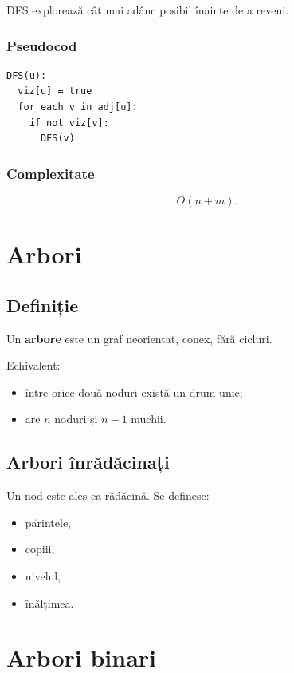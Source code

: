 \documentclass[12pt]{article}
\begin{document}
DFS explorează cât mai adânc posibil înainte de a reveni.

\subsubsection*{Pseudocod}

\begin{verbatim}
DFS(u):
  viz[u] = true
  for each v in adj[u]:
    if not viz[v]:
      DFS(v)
\end{verbatim}

\subsubsection*{Complexitate}



\[
O(n + m).
\]



\section{Arbori}

\subsection{Definiție}

Un \textbf{arbore} este un graf neorientat, conex, fără cicluri.

Echivalent:
\begin{itemize}
    \item între orice două noduri există un drum unic;
    \item are $n$ noduri și $n-1$ muchii.
\end{itemize}

\subsection{Arbori înrădăcinați}

Un nod este ales ca rădăcină. Se definesc:
\begin{itemize}
    \item părintele,
    \item copiii,
    \item nivelul,
    \item înălțimea.
\end{itemize}

\section{Arbori binari}
\end{document}
